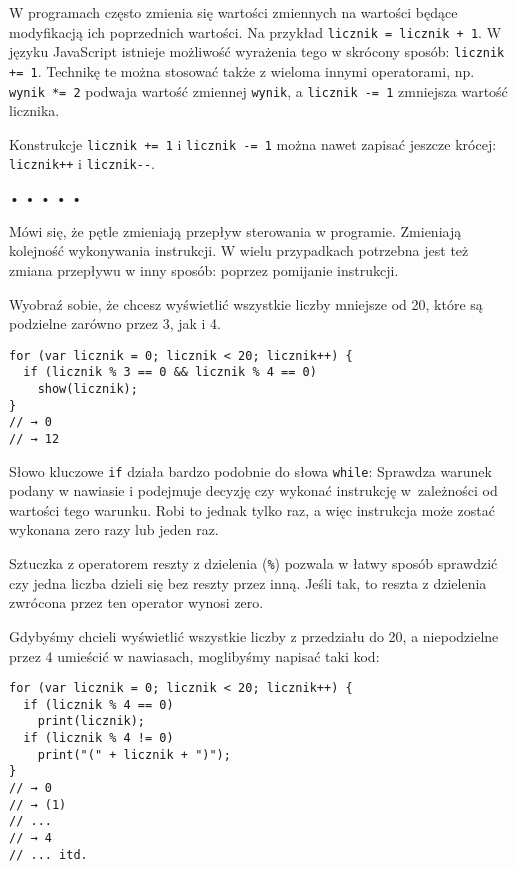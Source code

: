     
\index{+=}\index{$-$=}\index{/=}\index{*=}W programach często zmienia się wartości zmiennych na wartości będące modyfikacją ich poprzednich wartości. Na przykład \texttt{licznik = licznik + 1}. W języku JavaScript istnieje możliwość wyrażenia tego w skrócony sposób: \texttt{licznik += 1}. Technikę te można stosować także z wieloma innymi operatorami, np. \texttt{wynik *= 2} podwaja wartość zmiennej \texttt{wynik}, a \texttt{licznik -= 1} zmniejsza wartość licznika.

    
\index{++}\index{$--$}Konstrukcje \texttt{licznik += 1} i \texttt{licznik -= 1} można nawet zapisać jeszcze krócej: \texttt{licznik++} i \texttt{licznik-{}-}.

  
\begin{center}
• • • • •
\end{center}
  
    
Mówi się, że pętle zmieniają przepływ sterowania w programie. Zmieniają kolejność wykonywania instrukcji. W wielu przypadkach potrzebna jest też zmiana przepływu w inny sposób: poprzez pomijanie instrukcji.

    
Wyobraź sobie, że chcesz wyświetlić wszystkie liczby mniejsze od 20, które są podzielne zarówno przez 3, jak i 4.

\begin{verbatim} 
for (var licznik = 0; licznik < 20; licznik++) {
  if (licznik % 3 == 0 && licznik % 4 == 0)
    show(licznik);
}
// → 0
// → 12
\end{verbatim}
    
Słowo kluczowe \texttt{if} działa bardzo podobnie do słowa \texttt{while}: Sprawdza warunek podany w nawiasie i podejmuje decyzję czy wykonać instrukcję w~zależności od wartości tego warunku. Robi to jednak tylko raz, a więc instrukcja może zostać wykonana zero razy lub jeden raz.

    
Sztuczka z operatorem reszty z dzielenia (\texttt{\%})\index{\%} pozwala w łatwy sposób sprawdzić czy jedna liczba dzieli się bez reszty przez inną. Jeśli tak, to reszta z dzielenia zwrócona przez ten operator wynosi zero.

    
Gdybyśmy chcieli wyświetlić wszystkie liczby z przedziału do 20, a niepodzielne przez 4 umieścić w nawiasach, moglibyśmy napisać taki kod:

\begin{verbatim} 
for (var licznik = 0; licznik < 20; licznik++) {
  if (licznik % 4 == 0)
    print(licznik);
  if (licznik % 4 != 0)
    print("(" + licznik + ")");
}
// → 0
// → (1)
// ...
// → 4
// ... itd.
\end{verbatim}
    
